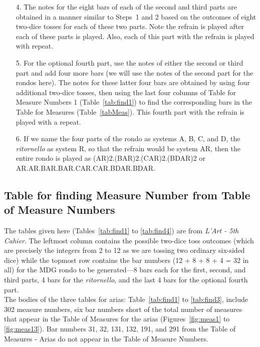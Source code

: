\documentclass[a4paper,x11names,svgnames,10pt]{article}
\begin{document}
{\begin{enumerate}
	\item[4.] The notes for the eight bars of each of the second and third parts are obtained in a manner similar to Steps~1 and 2 based on the outcomes of eight two-dice tosses for each of these two parts. Note the refrain is played after each of these parts is played. Also, each of this part with the refrain is played with repeat. 
	
	\item[5.] For the optional fourth part, use the notes of either the second or third part and add four more bars (we will use the notes of the second part for the rondos here).  The notes for these latter four bars are obtained by using four additional two-dice tosses, then using the last four columns of Table for Measure Numbers 1 (Table~\ref{tab:find1}) to find the corresponding bars in the  Table for Measures (Table~\ref{tabMeas}). This fourth part with the refrain is played with a repeat.
	
	\item[6.] If we name the four parts of the rondo as systems A, B, C, and D, the {\it ritornello} as system R, so that the refrain would be system AR, then the entire rondo is played as (AR)2.(BAR)2.(CAR)2.(BDAR)2 or  AR.AR.BAR.BAR.CAR.CAR.BDAR.BDAR.
	
\end{enumerate}   

\subsection{Table for finding Measure Number from Table of Measure Numbers}\label{tabFind}
The tables given here (Tables~\ref{tab:find1} to \ref{tab:find4}) are from {\em L'Art - 5th Cahier}.  The leftmost column contains the possible two-dice toss outcomes (which are precisely the integers from 2 to 12 as we are tossing two ordinary six-sided dice) while the topmost row contains the bar numbers (12 + 8 + 8 + 4 = 32 in all) for the MDG rondo to be generated---8 bars each for the first, second, and third parts, 4 bars for the {\it ritornello}, and the last 4 bars for the optional fourth part.\\

The bodies of the three tables for arias: Table~\ref{tab:find1} to \ref{tab:find3},  include 302 measure numbers, six bar numbers short of the total number of measures that appear in the Table of Measures for the arias (Figures~\ref{fig:meas1} to \ref{fig:meas13}). Bar numbers 31, 32, 131, 132, 191, and 291 from the Table of Measures - Arias do not appear in the Table of Measure Numbers.\\

}
\end{document}
